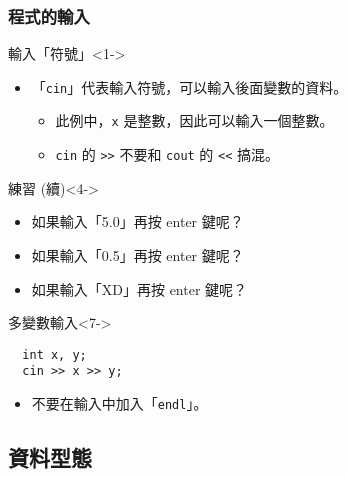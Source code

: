 \documentclass[utf8]{beamer}
\begin{document}
\begin{CJK}{UTF8}{bkai}
\begin{frame}[fragile]
  \frametitle{程式的輸入}
  \begin{exampleblock}{輸入「符號」}<1->
    \begin{itemize}
    \item 「\lstinline{cin}{}」代表輸入符號，可以輸入後面變數的資料。
      \begin{itemize}
      \item<2-> 此例中，\lstinline{x}{} 是整數，因此可以\alert{輸入一個整數}。
      \item<3-> \lstinline{cin}{} 的 \alert{\lstinline{>>}{}} 不要和 \lstinline{cout}{} 的 \alert{\lstinline{<<}{}} 搞混。
      \end{itemize}
    \end{itemize}
  \end{exampleblock}
  \begin{block}{練習 (續)}<4->
    \begin{itemize}
    \item 如果輸入「5.0」再按 enter 鍵呢？
    \item<5-> 如果輸入「0.5」再按 enter 鍵呢？
    \item<6-> 如果輸入「XD」再按 enter 鍵呢？
    \end{itemize}
  \end{block}
  \begin{alertblock}{多變數輸入}<7->
    \begin{lstlisting}
  int x, y;
  cin >> x >> y;
    \end{lstlisting}
    \begin{itemize}[<8->]
    \item 不要在輸入中加入「\lstinline{endl}{}」。
    \end{itemize}
  \end{alertblock}
\end{frame}

\subsection{資料型態}


\end{CJK}
\end{document}
